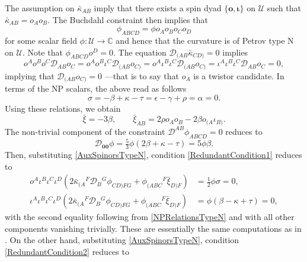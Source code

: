 \documentclass[10pt,a4paper]{article}
\newcommand\omicron{o}
\theoremstyle{plain}
\begin{document}
The assumption on $\bar{\kappa}_{AB}$ imply that there exists a spin dyad $\lbrace \bm\omicron, \bm\iota\rbrace$ on $\mathcal{U}$ such that $\bar{\kappa}_{AB}=\omicron_A\omicron_B$. The Buchdahl constraint then implies that 
\begin{equation}
\phi_{ABCD}=\phi \omicron_A\omicron_B\omicron_C\omicron_D
\end{equation}
for some scalar field $\phi:\mathcal{U}\rightarrow\mathbb{C}$ and hence that the curvature is of Petrov type N on $\mathcal{U}$. Note that $\phi_{ABCD}\omicron^D=0$. The equation $\mathcal{D}_{(AB}\bar{\kappa}_{CD)}=0$ implies 
\begin{equation*}
 \omicron^A \omicron^B \omicron^C \mathcal{D}_{AB}\omicron_C= \omicron^A \omicron^B \iota^C\mathcal{D}_{(AB}\omicron_{C)}= \omicron^A \iota^B \iota^C\mathcal{D}_{(AB}\omicron_{C)}= \iota^A \iota^B \iota^C\mathcal{D}_{AB}\omicron_{C}=0,
\end{equation*}
implying that $\mathcal{D}_{(AB}\omicron_{C)}=0$ ---that is to say that $\omicron_A$ is a twistor candidate. In terms of the NP scalars, the above read as follows 
\begin{equation}\label{NPRelationsTypeN} 
\sigma=- \beta + \kappa -  \tau=\epsilon -  \gamma + \rho=\alpha=0.
\end{equation}	
Using these relations, we obtain
\begin{equation}\label{AuxSpinorsTypeN}
 \bar{\xi} = -3\beta,\qquad \bar{\xi}_{AB} = 2\rho o_Ao_B - 2\beta o_{(A}\iota_{B)}.
\end{equation}
The non-trivial component of the constraint $\mathcal{D}^{AB}\phi_{ABCD}=0$ reduces to 
\begin{equation}
 \mathcal{D}_{\bm0\bm0}\phi = \tfrac{5}{3}\phi (2\beta  +  \kappa -  \tau)=5\phi\beta.\label{TypeNweylConstraint}
\end{equation}
Then, substituting \eqref{AuxSpinorsTypeN}, condition \eqref{RedundantCondition1} reduces to
\begin{align*}
\omicron^A \iota^B \iota^C \iota^D \left(2\bar{\kappa}_{(A}{}^{F}\mathcal{D}_{B}{}^{G}\phi_{CD)FG} + \phi_{(ABC}{}^{F}\bar{\xi}_{D)F}\right) &=\tfrac{1}{2}\phi\sigma =0,\\
\iota^A\iota^B \iota^C \iota^D \left(2\bar{\kappa}_{(A}{}^{F}\mathcal{D}_{B}{}^{G}\phi_{CD)FG} + \phi_{(ABC}{}^{F}\bar{\xi}_{D)F}\right) &=\phi(\beta -  \kappa  + \tau) = 0,
\end{align*}
with the second equality following from \eqref{NPRelationsTypeN} and
with all other components vanishing trivially. These are essentially the same computations as in \cite{BaeVal10c}. On the other hand, substituting \eqref{AuxSpinorsTypeN}, condition \eqref{RedundantCondition2} reduces to
\end{document}
